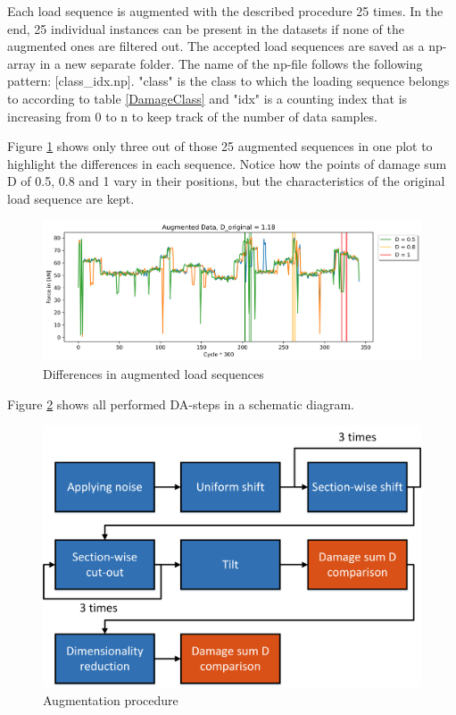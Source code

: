 Each load sequence is augmented with the described procedure 25 times. In the end, 25 individual instances can be present in the datasets if none of the augmented ones are filtered out. 
The accepted load sequences are saved as a np-array in a new separate folder. The name of the np-file follows the following pattern: [class\_idx.np]. "class" is the class to which the loading sequence belongs to according to table \ref{DamageClass} and "idx" is a counting index that is increasing from 0 to n to keep track of the number of data samples.

Figure \ref{fig:3in1} shows only three out of those 25 augmented sequences in one plot to highlight the differences in each sequence.
Notice how the points of damage sum D of 0.5, 0.8 and 1 vary in their positions, but the characteristics of the original load sequence are kept.

\begin{figure}[H]
	\centering
	\includegraphics[width=1\linewidth]{IMGs/Augmented_5.png}
	\caption{Differences in augmented load sequences}
	\label{fig:3in1}
\end{figure}

Figure \ref{fig:allDA} shows all performed DA-steps in a schematic diagram.

\begin{figure}[H]
	\centering
	\includegraphics[width=0.7\linewidth]{IMGs/Augmentation.png}
	\caption{Augmentation procedure}
	\label{fig:allDA}
\end{figure}

